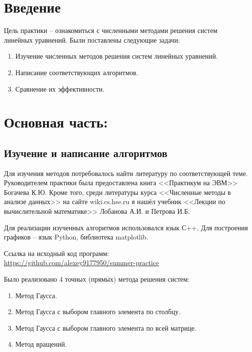 \documentclass{article}
\begin{document}


\tableofcontents

\section{Введение}
Цель практики -- ознакомиться с численными методами решения систем линейных уравнений. Были поставлены следующие задачи:
\begin{enumerate}
    \item Изучение численных методов решения систем линейных уравнений.
    \item Написание соответствующих алгоритмов.
    \item Сравнение их эффективности.
\end{enumerate}

\section{Основная часть:}

\subsection{Изучение и написание алгоритмов}

Для изучения методов потребовалось найти литературу по соответствующей теме. Руководителем практики была предоставлена книга <<Практикум на ЭВМ>> Богачева К.Ю. Кроме того, среди литературы курса <<Численные методы в анализе данных>> на сайте wiki.cs.hse.ru я нашёл учебник <<Лекции по вычислительной математике>> Лобанова А.И. и Петрова И.Б.

Для реализации изученных алгоритмов использовался язык С++. Для построения графиков -- язык Python, библиотека matplotlib.

Ссылка на исходный код программ: \\
\href{https://github.com/alexey9177950/summer-practice}{https://github.com/alexey9177950/summer-practice}

Было реализовано 4 точных (прямых) метода решения систем:
\begin{enumerate}
    \item Метод Гаусса.
    \item Метод Гаусса с выбором главного элемента по столбцу.
    \item Метод Гаусса с выбором главного элемента по всей матрице.
    \item Метод вращений.
\end{enumerate}
\end{document}
